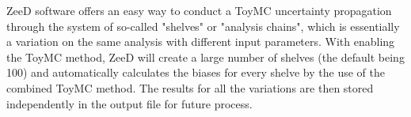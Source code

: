 ZeeD software offers an easy way to conduct a ToyMC uncertainty propagation through the system of so-called "shelves" or "analysis chains", which is essentially a variation on the same analysis with different input parameters. With enabling the ToyMC method, ZeeD will create a large number of shelves (the default being 100) and automatically calculates the biases for every shelve by the use of the combined ToyMC method. The results for all the variations are then stored independently in the output file for future process.
